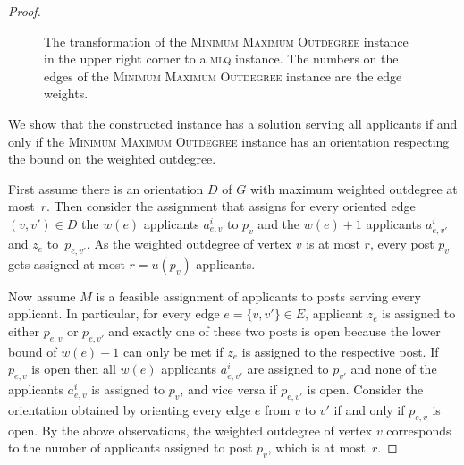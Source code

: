 \documentclass{llncs}
\begin{document}
\begin{proof}
\begin{figure}[htbp]
\caption{The transformation of the \textsc{Minimum Maximum Outdegree} instance in the upper right corner to a \textsc{mlq} instance. The numbers on the edges of the \textsc{Minimum Maximum Outdegree} instance are the edge weights.}
\label{fi:theorem6}
\end{figure}

  We show that the constructed instance has a solution serving all applicants if and only if the \textsc{Minimum Maximum Outdegree} instance has an orientation respecting the bound on the weighted outdegree. 
  
  First assume there is an orientation $D$ of $G$ with maximum weighted outdegree at most~$r$. Then consider the assignment that assigns for every oriented edge $(v, v') \in D$ the $w(e)$ applicants $a^i_{e, v}$ to $p_v$ and the $w(e) + 1$ applicants $a^i_{e, v'}$ and $z_e$ to~$p_{e, v'}$. As the weighted outdegree of vertex $v$ is at most $r$, every post $p_{v}$ gets assigned at most $r = u(p_v)$ applicants.
  
  Now assume $M$ is a feasible assignment of applicants to posts serving every applicant. In particular, for every edge $e = \{v,v'\} \in E$, applicant $z_e$ is assigned to either $p_{e, v}$ or $p_{e, v'}$ and exactly one of these two posts is open because the lower bound of $w(e) + 1$ can only be met if $z_e$ is assigned to the respective post. If $p_{e, v}$ is open then all $w(e)$ applicants $a^i_{e, v'}$ are assigned to $p_{v'}$ and none of the applicants $a^i_{e, v}$ is assigned to $p_{v}$, and vice versa if $p_{e, v'}$ is open. Consider the orientation obtained by orienting every edge $e$ from $v$ to $v'$ if and only if $p_{e, v}$ is open. By the above observations, the weighted outdegree of vertex $v$ corresponds to the number of applicants assigned to post $p_v$, which is at most~$r$.
  

\end{proof}
\end{document}
